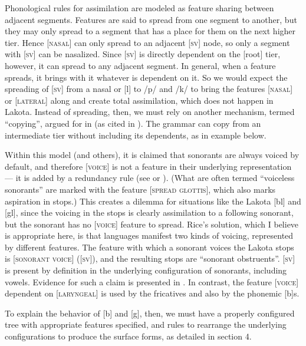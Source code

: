 \documentclass[output=paper]{LSP/langsci}
\begin{document}
Phonological rules for assimilation are modeled as feature sharing between adjacent segments. Features are said to spread from one segment to another, but they may only spread to a segment that has a place for them on the next higher tier. Hence [\textsc{nasal}] can only spread to an adjacent [\textsc{sv}] node, so only a segment with [\textsc{sv}] can be nasalized. Since [\textsc{sv}] is directly dependent on the [root] tier, however, it can spread to any adjacent segment. In general, when a feature spreads, it brings with it whatever is dependent on it. So we would expect the spreading of [\textsc{sv}] from a nasal or [l] to /p/ and /k/ to bring the features [\textsc{nasal}] or [\textsc{lateral}] along and create total assimilation, which does not happen in Lakota. Instead of spreading, then, we must rely on another mechanism, termed ``copying'', argued for in \citet{RiceAvery1991} (as cited in \citealt[316]{Rice1993}). The grammar can copy from an intermediate tier without including its dependents, as in example  below.

Within this model (and others), it is claimed that sonorants are always voiced by default, and therefore [\textsc{voice}] is not a feature in their underlying representation --- it is added by a redundancy rule (see \citealt[175, 177]{Botma2011} or \citealt[105]{Szigetvari2008}). (What are often termed ``voiceless sonorants'' are marked with the feature [\textsc{spread glottis}], which also marks aspiration in stops.) This creates a dilemma for situations like the Lakota [bl] and [gl], since the voicing in the stops is clearly assimilation to a following sonorant, but the sonorant has no [\textsc{voice}] feature to spread. Rice's solution, which I believe is appropriate here, is that languages manifest two kinds of voicing, represented by different features. The feature with which a sonorant voices the Lakota stops is [\textsc{sonorant voice}] ([\textsc{sv}]), and the resulting stops are ``sonorant obstruents''. [\textsc{sv}] is present by definition in the underlying configuration of sonorants, including vowels. Evidence for such a claim is presented in \citet{Rice1993,Rice2013}. In contrast, the feature [\textsc{voice}] dependent on [\textsc{laryngeal}] is used by the fricatives and also by the phonemic [b]s.

To explain the behavior of [b] and [g], then, we must have a properly configured tree with appropriate features specified, and rules to rearrange the underlying configurations to produce the surface forms, as detailed in section 4.
\end{document}
